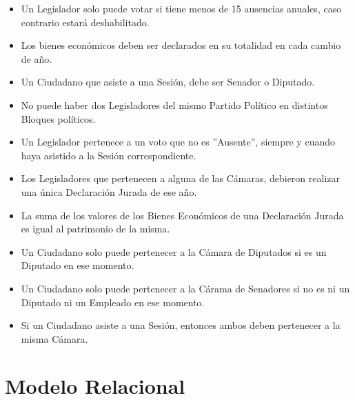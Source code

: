 \begin{itemize}
	\item Un Legislador solo puede votar si tiene menos de 15 ausencias anuales, caso contrario estará deshabilitado.
	\item Los bienes económicos deben ser declarados en su totalidad en cada cambio de año.
	\item Un Ciudadano que asiste a una Sesión, debe ser Senador o Diputado. 
	\item No puede haber dos Legisladores del mismo Partido Político en distintos Bloques políticos. 
	\item Un Legislador pertenece a un voto que no es ''Ausente'', siempre y cuando haya asistido a la Sesión correspondiente.
	\item Los Legisladores que pertenecen a alguna de las Cámaras, debieron realizar una única Declaración Jurada de ese año.
	\item La suma de los valores de los Bienes Económicos de una Declaración Jurada es igual al patrimonio de la misma. 
	\item Un Ciudadano solo puede pertenecer a la Cámara de Diputados si es un Diputado en ese momento.
	\item Un Ciudadano solo puede pertenecer a la Cárama de Senadores si no es ni un Diputado ni un Empleado en ese momento. 
	\item Si un Ciudadano asiste a una Sesión, entonces ambos deben pertenecer a la misma Cámara.

\end{itemize}

\newpage

\section{Modelo Relacional}

